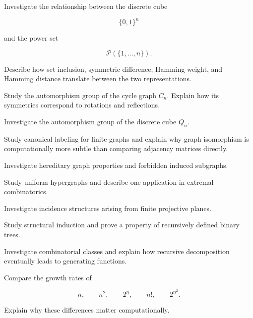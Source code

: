 \begin{exercise}[4]
Investigate the relationship between the discrete cube

\[
\{0,1\}^n
\]

and the power set

\[
\mathcal{P}(\{1,\ldots,n\}).
\]

Describe how set inclusion, symmetric difference, Hamming weight, and
Hamming distance translate between the two representations.
\end{exercise}

\begin{exercise}[4]
Study the automorphism group of the cycle graph \(C_n\). Explain how its
symmetries correspond to rotations and reflections.
\end{exercise}

\begin{exercise}[4]
Investigate the automorphism group of the discrete cube \(Q_n\).
\end{exercise}

\begin{exercise}[4]
Study canonical labeling for finite graphs and explain why graph
isomorphism is computationally more subtle than comparing adjacency
matrices directly.
\end{exercise}

\begin{exercise}[4]
Investigate hereditary graph properties and forbidden induced
subgraphs.
\end{exercise}

\begin{exercise}[4]
Study uniform hypergraphs and describe one application in extremal
combinatorics.
\end{exercise}

\begin{exercise}[4]
Investigate incidence structures arising from finite projective planes.
\end{exercise}

\begin{exercise}[4]
Study structural induction and prove a property of recursively defined
binary trees.
\end{exercise}

\begin{exercise}[4]
Investigate combinatorial classes and explain how recursive
decomposition eventually leads to generating functions.
\end{exercise}

\begin{exercise}[4]
Compare the growth rates of

\[
n,
\qquad
n^2,
\qquad
2^n,
\qquad
n!,
\qquad
2^{n^2}.
\]

Explain why these differences matter computationally.
\end{exercise}

